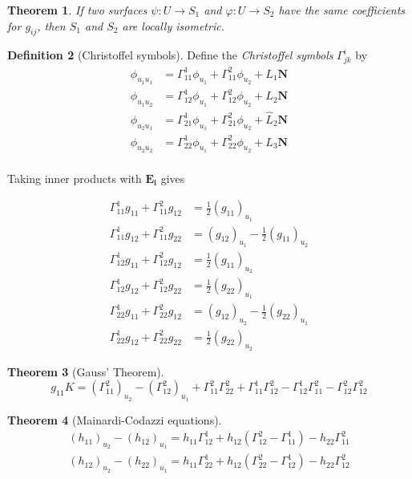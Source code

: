 \documentclass[10pt, oneside, reqno]{amsart}
\newcommand{\christ}[3]{\ensuremath{\Gamma^{#1}_{#2#3}}}
\theoremstyle{plain}%
\newtheorem{thm}{Theorem}[section]
\theoremstyle{definition}
\newtheorem{defn}[thm]{Definition}
\theoremstyle{remark}
\begin{document}
\begin{thm}
	If two surfaces $\psi: U \rightarrow S_1$ and $\varphi: U \rightarrow S_2 $  have the same coefficients for $g_{ij}$, then $S_1$ and $S_2$ are locally isometric.
\end{thm}
\begin{defn}[Christoffel symbols]
	Define the \emph{Christoffel symbols} $\christ{i}{j}{k}$ by 
	\begin{align*}
		\phi_{u_1 u_1} & = \christ{1}{1}{1} \phi_{u_1} + \christ{2}{1}{1} \phi_{u_2} + L_1 \mathbf{N} \\
		\phi_{u_1 u_2} & = \christ{1}{1}{2} \phi_{u_1} + \christ{2}{1}{2} \phi_{u_2} + L_2 \mathbf{N} \\
		\phi_{u_2 u_1} & = \christ{1}{2}{1} \phi_{u_1} + \christ{2}{2}{1} \phi_{u_2} + \hat{L}_2 \mathbf{N}\\
		\phi_{u_2 u_2} & = \christ{1}{2}{2} \phi_{u_1} + \christ{2}{2}{2} \phi_{u_2} + L_3 \mathbf{N}\\
	\end{align*}
	
	Taking inner products with $\mathbf{E_i}$ gives
	
	\begin{align*}
		\christ{1}{1}{1}g_{11} + \christ{2}{1}{1}g_{12} &= \frac{1}{2}(g_{11})_{u_1} \\
			\christ{1}{1}{1}g_{12} + \christ{2}{1}{1}g_{22} &= (g_{12})_{u_1} - \frac{1}{2}(g_{11})_{u_2}\\
				\christ{1}{1}{2}g_{11} + \christ{2}{1}{2}g_{12} &= \frac{1}{2}(g_{11})_{u_2}\\
					\christ{1}{1}{2}g_{12} + \christ{2}{1}{2}g_{22} &= \frac{1}{2}(g_{22})_{u_1} \\
						\christ{1}{2}{2}g_{11} + \christ{2}{2}{2}g_{12} &= (g_{12})_{u_2} - \frac{1}{2}(g_{22})_{u_1}\\
							\christ{1}{2}{2}g_{12} + \christ{2}{2}{2}g_{22} &= \frac{1}{2}(g_{22})_{u_2}
	\end{align*}
\end{defn}

\begin{thm}[Gauss' Theorem]
\[	g_{11}K = (\christ{2}{1}{1})_{u_2} - (\christ{2}{1}{2})_{u_1} + \christ{2}{1}{1} \christ{2}{2}{2} + \christ{1}{1}{1}\christ{2}{1}{2} - \christ{1}{1}{2}\christ{2}{1}{1} - \christ{2}{1}{2}\christ{2}{1}{2}     \]
\end{thm}

\begin{thm}[Mainardi-Codazzi equations]
	\begin{align*}
		(h_{11})_{u_2} - (h_{12})_{u_1} = h_{11} \christ{1}{1}{2} + h_{12}(\christ{2}{1}{2}-\christ{1}{1}{1}) - h_{22}\christ{2}{1}{1} \\
			(h_{12})_{u_2} - (h_{22})_{u_1} = h_{11} \christ{1}{2}{2} + h_{12}(\christ{2}{2}{2}-\christ{1}{1}{2}) - h_{22}\christ{2}{1}{2} 
	\end{align*}
\end{thm}
\end{document}
